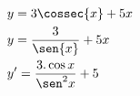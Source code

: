 \begin{ex}
\begin{align}
&y=3\cossec{x}+5x\nonumber\\
&y=\frac{3}{\sen{x}}+5x\nonumber\\
&y'=\frac{3.\cos{x}}{\sen^2{x}}+5\nonumber
\end{align}
\end{ex}